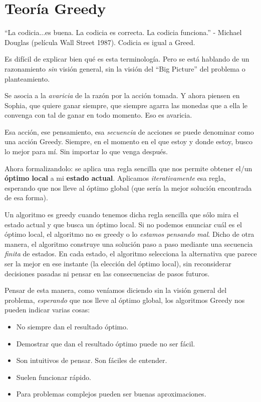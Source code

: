 \section{Teoría Greedy}

``La codicia...es buena. La codicia es correcta. La codicia funciona.'' - Michael Douglas (película Wall Street 1987).
Codicia es igual a Greed. 

Es difícil de explicar bien qué es esta terminología. Pero se está hablando de un razonamiento \textit{sin} visión general, sin la visión del ``Big Picture'' del problema o planteamiento.

Se asocia a la \textit{avaricia} de la razón por la acción tomada. Y ahora piensen en Sophia, que quiere ganar siempre, que siempre agarra las monedas que a ella le convenga con tal de ganar en todo momento. Eso es avaricia.

Esa acción, ese pensamiento, esa \textit{secuencia} de acciones se puede denominar como una acción Greedy. Siempre, en el momento en el que estoy y donde estoy, busco lo mejor para mí. Sin importar lo que venga después.

Ahora formalizandolo: se aplica una regla sencilla que nos permite obtener el/un \textbf{óptimo local} a mi \textbf{estado actual}. Aplicamos \textit{iterativamente} esa regla, esperando que nos lleve al óptimo global (que sería la mejor solución encontrada de esa forma).

Un algoritmo es greedy cuando tenemos dicha regla sencilla que sólo mira el estado actual y que busca un óptimo local. Si no podemos enunciar cuál es el óptimo local, el algoritmo no es greedy o lo \textit{estamos pensando mal}.
Dicho de otra manera, el algoritmo construye una solución paso a paso mediante una secuencia \textit{finita} de estados. En cada estado, el algoritmo selecciona la alternativa que parece ser la mejor en ese instante (la elección del óptimo local), sin reconsiderar decisiones pasadas ni pensar en las consecuencias de pasos futuros.

Pensar de esta manera, como veníamos diciendo sin la visión general del problema, \textit{esperando} que nos lleve al óptimo global, los algoritmos Greedy nos pueden indicar varias cosas:
\begin{itemize}
    \item No siempre dan el resultado óptimo.
    \item Demostrar que dan el resultado óptimo puede no ser fácil.
    \item Son intuitivos de pensar. Son fáciles de entender.
    \item Suelen funcionar rápido.
    \item Para problemas complejos pueden ser buenas aproximaciones.
\end{itemize}

